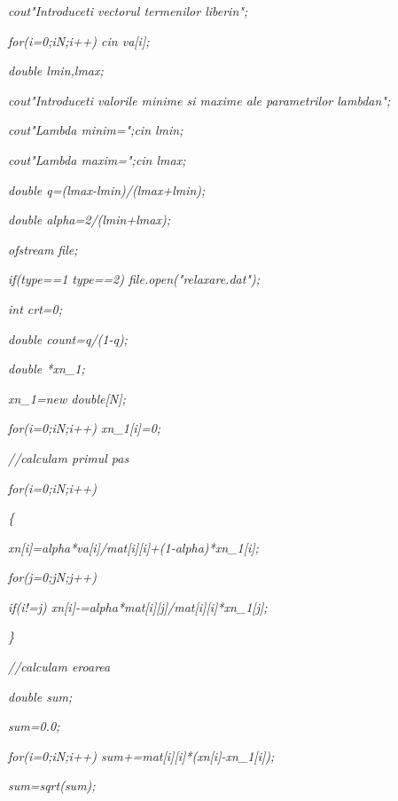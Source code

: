 \documentclass[a4paper,twoside]{book}
\begin{document}
\textit{\qquad cout\TEXTsymbol{<}\TEXTsymbol{<}"Introduceti vectorul
termenilor liberi\TEXTsymbol{\backslash}n";}

\textit{\qquad for(i=0;i\TEXTsymbol{<}N;i++) cin\TEXTsymbol{>}\TEXTsymbol{>}%
va[i];}

\textit{\qquad double lmin,lmax;}

\textit{\qquad cout\TEXTsymbol{<}\TEXTsymbol{<}"Introduceti valorile minime
si maxime ale parametrilor lambda\TEXTsymbol{\backslash}n";}

\textit{\qquad cout\TEXTsymbol{<}\TEXTsymbol{<}"Lambda minim=";cin%
\TEXTsymbol{>}\TEXTsymbol{>}lmin;}

\textit{\qquad cout\TEXTsymbol{<}\TEXTsymbol{<}"Lambda maxim=";cin%
\TEXTsymbol{>}\TEXTsymbol{>}lmax;}

\textit{\qquad double q=(lmax-lmin)/(lmax+lmin);}

\textit{\qquad double alpha=2/(lmin+lmax);}

\textit{\qquad ofstream file;}

\textit{\qquad if(type==1 \TEXTsymbol{\vert}\TEXTsymbol{\vert} type==2)
file.open("relaxare.dat");}

\textit{\qquad int crt=0;}

\textit{\qquad double count=q/(1-q);}

\textit{\qquad double *xn\_1;}

\textit{\qquad xn\_1=new double[N];}

\textit{\qquad for(i=0;i\TEXTsymbol{<}N;i++) xn\_1[i]=0;}

\textit{\qquad //calculam primul pas}

\textit{\qquad for(i=0;i\TEXTsymbol{<}N;i++)}

\textit{\qquad \{}

\textit{\qquad \qquad xn[i]=alpha*va[i]/mat[i][i]+(1-alpha)*xn\_1[i];}

\textit{\qquad \qquad for(j=0;j\TEXTsymbol{<}N;j++)}

\textit{\qquad \qquad \qquad if(i!=j)
xn[i]-=alpha*mat[i][j]/mat[i][i]*xn\_1[j];}

\textit{\qquad \}}

\textit{\qquad //calculam eroarea}

\textit{\qquad double sum;}

\textit{\qquad sum=0.0;}

\textit{\qquad for(i=0;i\TEXTsymbol{<}N;i++) sum+=mat[i][i]*(xn[i]-xn\_1[i]);%
}

\textit{\qquad sum=sqrt(sum);}
\end{document}
